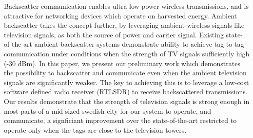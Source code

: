 Backscatter communication enables ultra-low
power wireless transmissions, and is attractive
for networking devices which operate 
on harvested energy. Ambient backscatter
takes the concept further, by leveraging
ambient wireless signals like
television signals, as both the source of power
and carrier signal. Existing state-of-the-art ambient backscatter
systems demonstrate ability to achieve tag-to-tag communication 
under conditions when the
strength of TV signals  sufficiently high (-30 dBm).  In this paper, we present our preliminary work
which demonstrates the possibility to backscatter and communicate even when the ambient television signals
are significantly weaker. The key to achieving this is to leverage a low-cost
software defined radio receiver (RTLSDR) to receive backscattered transmissions. Our results 
demonstrate that the strength of television signals is strong 
enough in most parts of a mid-sized swedish city for our system
to operate, and communicate, a signficiant improvement over the
state-of-the-art restricted to operate only when the tags are close to the television towers.
